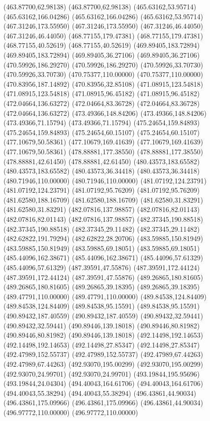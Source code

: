 {(463.87700,62.98138) (463.87700,62.98138) (465.63162,53.95714) (465.63162,166.04286) (465.63162,166.04286) (465.63162,53.95714) (467.31246,173.55950) (467.31246,173.55950)
(467.31246,46.44050) (467.31246,46.44050) (468.77155,179.47381) (468.77155,179.47381) (468.77155,40.52619) (468.77155,40.52619) (469.89405,183.72894) (469.89405,183.72894)
(469.89405,36.27106) (469.89405,36.27106) (470.59926,186.29270) (470.59926,186.29270) (470.59926,33.70730) (470.59926,33.70730) (470.75377,110.00000) (470.75377,110.00000)
(470.83956,187.14892) (470.83956,32.85108) (471.08915,123.54818) (471.08915,123.54818) (471.08915,96.45182) (471.08915,96.45182) (472.04664,136.63272) (472.04664,83.36728)
(472.04664,83.36728) (472.04664,136.63272) (473.49366,148.84206) (473.49366,148.84206) (473.49366,71.15794) (473.49366,71.15794) (475.24654,159.84893) (475.24654,159.84893)
(475.24654,60.15107) (475.24654,60.15107) (477.10679,50.58361) (477.10679,169.41639) (477.10679,169.41639) (477.10679,50.58361) (478.88881,177.38550) (478.88881,177.38550)
(478.88881,42.61450) (478.88881,42.61450) (480.43573,183.65582) (480.43573,183.65582) (480.43573,36.34418) (480.43573,36.34418) (480.71946,110.00000) (480.71946,110.00000)
(481.07192,124.23791) (481.07192,124.23791) (481.07192,95.76209) (481.07192,95.76209) (481.62580,188.16709) (481.62580,188.16709) (481.62580,31.83291) (481.62580,31.83291)
(482.07816,137.98857) (482.07816,82.01143) (482.07816,82.01143) (482.07816,137.98857) (482.37345,190.88518) (482.37345,190.88518) (482.37345,29.11482) (482.37345,29.11482)
(482.62822,191.79294) (482.62822,28.20706) (483.59885,150.81949) (483.59885,150.81949) (483.59885,69.18051) (483.59885,69.18051) (485.44096,162.38671) (485.44096,162.38671)
(485.44096,57.61329) (485.44096,57.61329) (487.39591,47.55876) (487.39591,172.44124) (487.39591,172.44124) (487.39591,47.55876) (489.26865,180.81605) (489.26865,180.81605)
(489.26865,39.18395) (489.26865,39.18395) (489.47791,110.00000) (489.47791,110.00000) (489.84538,124.84409) (489.84538,124.84409) (489.84538,95.15591) (489.84538,95.15591)
(490.89432,187.40559) (490.89432,187.40559) (490.89432,32.59441) (490.89432,32.59441) (490.89446,139.18018) (490.89446,80.81982) (490.89446,80.81982) (490.89446,139.18018)
(492.14498,192.14653) (492.14498,192.14653) (492.14498,27.85347) (492.14498,27.85347) (492.47989,152.55737) (492.47989,152.55737) (492.47989,67.44263) (492.47989,67.44263)
(492.93070,195.00299) (492.93070,195.00299) (492.93070,24.99701) (492.93070,24.99701) (493.19844,195.95696) (493.19844,24.04304) (494.40043,164.61706) (494.40043,164.61706)
(494.40043,55.38294) (494.40043,55.38294) (496.43861,44.90034) (496.43861,175.09966) (496.43861,175.09966) (496.43861,44.90034) (496.97772,110.00000) (496.97772,110.00000)
}
